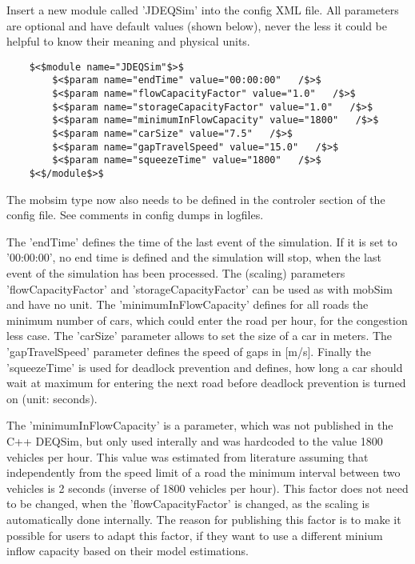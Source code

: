 \documentclass[a4paper,11pt]{report}
\begin{document}
Insert  a new module called 'JDEQSim' into the config XML file. All parameters  are optional and have default values (shown below), never the less it  could be helpful to know their meaning and physical units.
\begin{verbatim}
	$<$module name="JDEQSim"$>$
		$<$param name="endTime" value="00:00:00"   /$>$
		$<$param name="flowCapacityFactor" value="1.0"   /$>$
		$<$param name="storageCapacityFactor" value="1.0"   /$>$
		$<$param name="minimumInFlowCapacity" value="1800"   /$>$
		$<$param name="carSize" value="7.5"   /$>$
		$<$param name="gapTravelSpeed" value="15.0"   /$>$
		$<$param name="squeezeTime" value="1800"   /$>$
	$<$/module$>$
\end{verbatim}The mobsim type now  also needs to be defined in the controler section of the config  file. See comments in config dumps in logfiles.

The  'endTime' defines the time of the last event of the simulation. If it is  set to '00:00:00', no end time is defined and the simulation will stop,  when the last event of the simulation has been processed. The (scaling)  parameters  'flowCapacityFactor' and 'storageCapacityFactor' can  be used as with mobSim and have no unit. The 'minimumInFlowCapacity'  defines for all roads the minimum number of cars, which could enter the  road per hour, for the congestion less case. The 'carSize' parameter  allows to set the size of a car in meters. The 'gapTravelSpeed'  parameter defines the speed of gaps in [m/s]. Finally the 'squeezeTime'  is used for deadlock prevention and defines, how long a car should wait  at maximum for entering the next road before deadlock prevention is  turned on (unit: seconds).

The 'minimumInFlowCapacity' is a  parameter, which was not published in the C++ DEQSim, but only used  interally and was hardcoded to the value 1800 vehicles per hour. This  value was estimated from literature assuming that independently from the  speed limit of a road the minimum interval between two vehicles is 2  seconds (inverse of 1800 vehicles per hour). This factor does not need  to be changed, when the 'flowCapacityFactor' is changed, as the scaling  is automatically done internally. The reason for publishing this factor  is to make it possible for users to adapt this factor, if they want to  use a different minium inflow capacity based on their model estimations.
\end{document}
